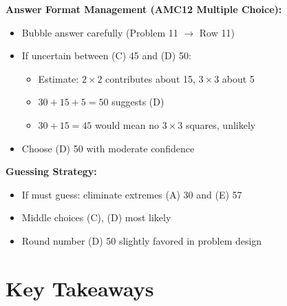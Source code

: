 \documentclass[12pt]{article}
\begin{document}
\begin{competitionbox}
\textbf{Answer Format Management (AMC12 Multiple Choice):}
\begin{itemize}
    \item Bubble answer carefully (Problem 11 $\rightarrow$ Row 11)
    \item If uncertain between (C) 45 and (D) 50:
    \begin{itemize}
        \item Estimate: $2 \times 2$ contributes about 15, $3 \times 3$ about 5
        \item $30 + 15 + 5 = 50$ suggests (D)
        \item $30 + 15 = 45$ would mean no $3 \times 3$ squares, unlikely
    \end{itemize}
    \item Choose (D) 50 with moderate confidence
\end{itemize}

\textbf{Guessing Strategy:}
\begin{itemize}
    \item If must guess: eliminate extremes (A) 30 and (E) 57
    \item Middle choices (C), (D) most likely
    \item Round number (D) 50 slightly favored in problem design
\end{itemize}
\end{competitionbox}

\newpage

\section{Key Takeaways}
\end{document}
